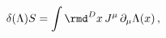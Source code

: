 \begin{equation}
  \delta (\Lambda ) S =\int \rmd^Dx\, J^\mu\,\partial _\mu \Lambda (x)\,,
 \label{delSJdLambda}
\end{equation}

